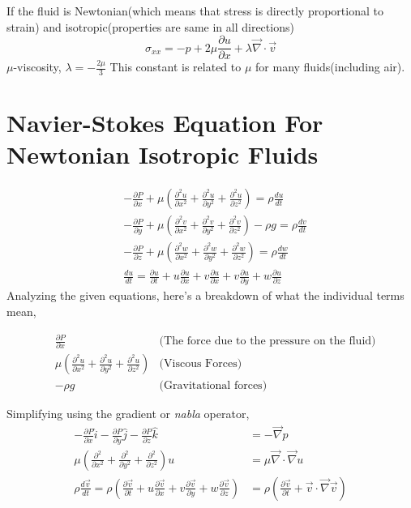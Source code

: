 \documentclass{report}
\begin{document}
If the fluid is Newtonian(which means that stress is directly proportional to strain) and isotropic(properties are same in all directions)
\[
  \sigma_{xx} = -p + 2 \mu \frac{\partial u}{\partial x} + \lambda \vec{\nabla}\cdot\vec{v}
\]
$\mu$-viscosity, $\lambda = -\frac{2\mu}{3}$ This constant is related to $\mu$ for many fluids(including air). 
\section{Navier-Stokes Equation For Newtonian Isotropic Fluids} %
\begin{align*}
  &-\frac{\partial P}{\partial x} + \mu(\frac{\partial^2 u}{\partial x^2} + \frac{\partial^2 u}{\partial y^2} + \frac{\partial^2 u}{\partial z^2}) = \rho \frac{du}{dt} \\
  &-\frac{\partial P}{\partial y} + \mu(\frac{\partial^2 v}{\partial x^2} + \frac{\partial^2 v}{\partial y^2} + \frac{\partial^2 v}{\partial z^2}) - \rho g = \rho \frac{dv}{dt} \\
  &-\frac{\partial P}{\partial z} + \mu(\frac{\partial^2 w}{\partial x^2} + \frac{\partial^2 w}{\partial y^2} + \frac{\partial^2 w}{\partial z^2}) = \rho \frac{dw}{dt} \\
  &\frac{du}{dt} = \frac{\partial u}{\partial t} + u \frac{\partial u}{\partial x} + v\frac{\partial u}{\partial x} + v \frac{\partial u}{\partial y} + w \frac{\partial u}{\partial z}
\end{align*}
Analyzing the given equations, here's a breakdown of what the individual terms mean, 

\begin{align*}
  &\frac{\partial P}{\partial x} &\text{(The force due to the pressure on the fluid)} \\
  &\mu(\frac{\partial^2 u}{\partial x^2} + \frac{\partial^2 u}{\partial y^2} + \frac{\partial^2 u}{\partial z^2}) &\text{(Viscous Forces)} \\
  &-\rho g & \text{(Gravitational forces)}
\end{align*}

Simplifying using the gradient or \textit{nabla} operator, 
\begin{align*}
	-\frac{\partial P}{\partial x} \hat{i} - \frac{\partial P}{\partial y} \hat{j} - \frac{\partial P}{\partial z}\hat{k} &= -\vec{\nabla} p \\ 
    \mu(\frac{\partial^2}{\partial x^2} + \frac{\partial^2}{\partial y^2} + \frac{\partial^2}{\partial z^2})u &= \mu \vec{\nabla} \cdot \vec{\nabla} u  \\
    \rho \frac{d \vec{v}}{dt} = \rho(\frac{\partial \vec{v}}{\partial t} + u \frac{\partial \vec{v}}{\partial x} + v \frac{\partial \vec{v}}{\partial y} + w \frac{\partial \vec{v}}{\partial z}) &= \rho(\frac{\partial \vec{v}}{\partial t} + \vec{v} \cdot \vec{\nabla} \vec{v})
\end{align*}
\end{document}
